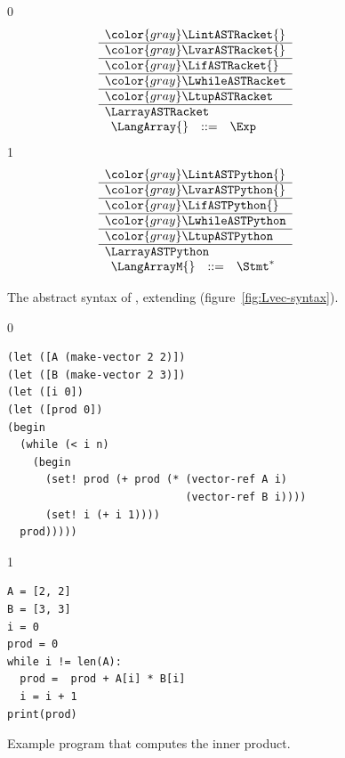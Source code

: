 \documentclass[7x10]{TimesAPriori_MIT}%
\newcommand{\gray}[1]{{\color{gray} #1}}
\def\racketEd{0}
\def\pythonEd{1}
\def\edition{1}
\newcommand{\pythonColor}[0]{}
\numberwithin{theorem}{chapter}
\numberwithin{definition}{chapter}
\numberwithin{equation}{chapter}
\begin{document}
\begin{figure}[tp]
\centering
\begin{tcolorbox}[colback=white]
    \small
{\if\edition\racketEd    
\[
\begin{array}{l}
  \gray{\LintASTRacket{}} \\ \hline
  \gray{\LvarASTRacket{}} \\ \hline
  \gray{\LifASTRacket{}} \\ \hline
  \gray{\LwhileASTRacket} \\ \hline
  \gray{\LtupASTRacket} \\ \hline
  \LarrayASTRacket \\
\begin{array}{lcl}
  \LangArray{} &::=& \Exp
\end{array}
\end{array}
\]
\fi}
{\if\edition\pythonEd\pythonColor    
\[
\begin{array}{l}
  \gray{\LintASTPython{}} \\ \hline
  \gray{\LvarASTPython{}} \\ \hline
  \gray{\LifASTPython{}} \\ \hline
  \gray{\LwhileASTPython} \\ \hline
  \gray{\LtupASTPython} \\ \hline
  \LarrayASTPython \\
\begin{array}{rcl}
  \LangArrayM{} &::=& \Stmt^{*}
\end{array}
\end{array}
\]
\fi}
\end{tcolorbox}
\caption{The abstract syntax of \LangArray{}, extending \LangVec{} (figure~\ref{fig:Lvec-syntax}).}
\label{fig:Lvecof-syntax}
\end{figure}


\begin{figure}[tp]
\begin{tcolorbox}[colback=white]  
{\if\edition\racketEd
\begin{lstlisting}
(let ([A (make-vector 2 2)])
(let ([B (make-vector 2 3)])
(let ([i 0])
(let ([prod 0])
(begin
  (while (< i n)
    (begin
      (set! prod (+ prod (* (vector-ref A i)
                            (vector-ref B i))))
      (set! i (+ i 1))))
  prod)))))
\end{lstlisting}
\fi}
{\if\edition\pythonEd\pythonColor    
\begin{lstlisting}
A = [2, 2]
B = [3, 3]
i = 0
prod = 0
while i != len(A):
  prod =  prod + A[i] * B[i]
  i = i + 1
print(prod)
\end{lstlisting}
\fi}
\end{tcolorbox}

\caption{Example program that computes the inner product.}
\label{fig:inner_product}
\end{figure}
\end{document}
